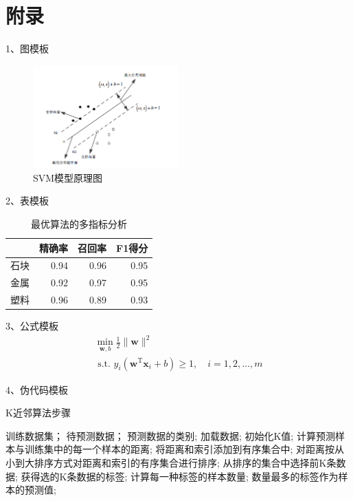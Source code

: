 \documentclass{article}
\begin{document}
\newpage{}
\appendix
\section{附录}
\begin{appendices}
1、图模板
\begin{figure}[htpb]               
	\centering
	\includegraphics[width=0.5\textwidth]{svm.png}
	\caption{SVM模型原理图}
	\label{fig:svm}
\end{figure}

2、表模板
\begin{table}[htpb]
\caption{最优算法的多指标分析}
\begin{center}\label{table:score}
\begin{tabular}{|c|r|r|r|}
\hline
   & \multicolumn{1}{c|}{精确率} & \multicolumn{1}{c|}{召回率} & \multicolumn{1}{c|}{F1得分} \\ \hline
石块 & 0.94                     & 0.96                     & 0.95                      \\ \hline
金属 & 0.92                     & 0.97                     & 0.95                      \\ \hline
塑料 & 0.96                     & 0.89                     & 0.93                      \\ \hline
\end{tabular}
\end{center}
\end{table}

3、公式模板
\begin{equation}\label{eq:svmsuper}
\begin{array}{l}
\min _{\boldsymbol{w}, b} \frac{1}{2}\|\boldsymbol{w}\|^{2} \\
\text { s.t. } y_{i}\left(\boldsymbol{w}^{\mathrm{T}} \boldsymbol{x}_{i}+b\right) \geqslant 1, \quad i=1,2, \ldots, m
\end{array}
\end{equation}


4、伪代码模板
 \begin{algorithm}[H]
  \caption{ K近邻算法步骤}
  \begin{algorithmic}[1]
    \Require
      训练数据集；
      待预测数据；
    \Ensure
      预测数据的类别;
    \State 加载数据;
    \State 初始化K值;
    \State 计算预测样本与训练集中的每一个样本的距离;
    \State 将距离和索引添加到有序集合中;
    \State 对距离按从小到大排序方式对距离和索引的有序集合进行排序;
    \State 从排序的集合中选择前K条数据;
    \State 获得选的K条数据的标签;
    \State 计算每一种标签的样本数量;
    \Return 
        数量最多的标签作为样本的预测值;
  \end{algorithmic}
\end{algorithm}



\end{appendices}
\end{document}
